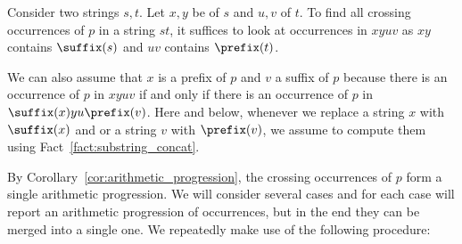 Consider two strings $s,t$. Let $x, y$ be  of $s$ and $u, v$  of $t$. To find all crossing occurrences of $p$ in a string $st$, it suffices to look at occurrences in $xyuv$ as $xy$ contains $\suffix(s)$ and $uv$ contains $\prefix(t)$.

We can also assume that $x$ is a prefix of $p$ and $v$ a suffix of $p$ because there is an occurrence of $p$ in $xyuv$ if and only if there is an occurrence of $p$ in $\suffix(x) y u\prefix(v)$. Here and below, whenever we replace a string $x$ with $\suffix(x)$ and or a string $v$ with $\prefix(v)$, we assume to compute them using Fact~\ref{fact:substring_concat}. 

By Corollary~\ref{cor:arithmetic_progression}, the crossing occurrences of $p$ form a single arithmetic progression. 
We will consider several cases and for each case will report an arithmetic progression of occurrences, but in the end they can be merged into a single one. We repeatedly make use of the following procedure:

